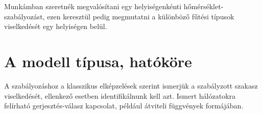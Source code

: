 


Munkámban szeretnék megvalósítani egy helyiségenkénti hőmérséklet-szabályozást, ezen keresztül pedig megmutatni a különböző fűtési típusok viselkedését egy helyiségen belül.





 


\section{A modell típusa, hatóköre}

A szabályozáshoz a klasszikus elképzelések szerint ismerjük a szabályzott szakasz viselkedését, ellenkező esetben identifikálnunk kell azt. Ismert hálózatokra felírható gerjesztés-válasz kapcsolat, például átviteli függvények formájában. %


